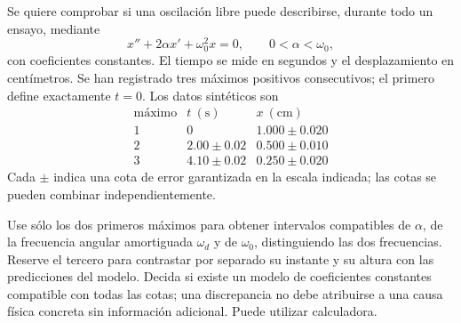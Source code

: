 Se quiere comprobar si una oscilación libre puede describirse, durante todo un ensayo, mediante
\[
x''+2\alpha x'+\omega_0^2x=0,
\qquad 0<\alpha<\omega_0,
\]
con coeficientes constantes. El tiempo se mide en segundos y el desplazamiento en centímetros. Se han registrado tres máximos positivos consecutivos; el primero define exactamente \(t=0\). Los datos sintéticos son
\[
\begin{array}{c|cc}
\text{máximo}&t\ (\mathrm s)&x\ (\mathrm{cm})\\\hline
1&0&1.000\pm0.020\\
2&2.00\pm0.02&0.500\pm0.010\\
3&4.10\pm0.02&0.250\pm0.020
\end{array}
\]
Cada \(\pm\) indica una cota de error garantizada en la escala indicada; las cotas se pueden combinar independientemente.

Use sólo los dos primeros máximos para obtener intervalos compatibles de \(\alpha\), de la frecuencia angular amortiguada \(\omega_d\) y de \(\omega_0\), distinguiendo las dos frecuencias. Reserve el tercero para contrastar por separado su instante y su altura con las predicciones del modelo. Decida si existe un modelo de coeficientes constantes compatible con todas las cotas; una discrepancia no debe atribuirse a una causa física concreta sin información adicional. Puede utilizar calculadora.
